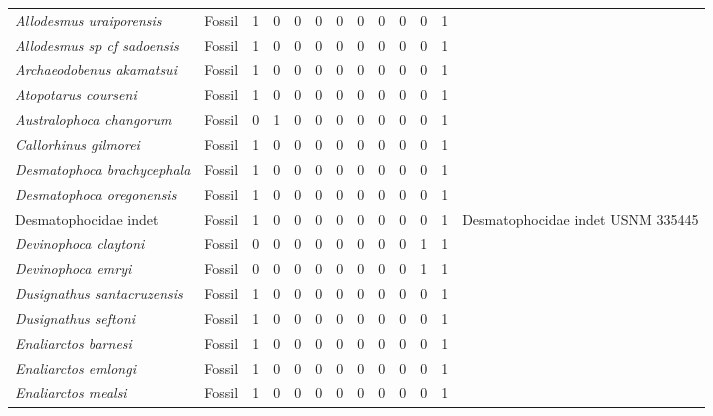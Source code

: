\begin{longtable}{llccccccccccp{}}
\textit{Allodesmus uraiporensis} &
Fossil &
1 &
0 &
0 &
0 &
0 &
0 &
0 &
0 &
0 &
1 &
\\

\textit{Allodesmus sp cf sadoensis} &
Fossil &
1 &
0 &
0 &
0 &
0 &
0 &
0 &
0 &
0 &
1 &
\\

\textit{Archaeodobenus akamatsui} &
Fossil &
1 &
0 &
0 &
0 &
0 &
0 &
0 &
0 &
0 &
1 &
\\

\textit{Atopotarus courseni} &
Fossil &
1 &
0 &
0 &
0 &
0 &
0 &
0 &
0 &
0 &
1 &
\\

\textit{Australophoca changorum} &
Fossil &
0 &
1 &
0 &
0 &
0 &
0 &
0 &
0 &
0 &
1 &
\\

\textit{Callorhinus gilmorei} &
Fossil &
1 &
0 &
0 &
0 &
0 &
0 &
0 &
0 &
0 &
1 &
\\

\textit{Desmatophoca brachycephala} &
Fossil &
1 &
0 &
0 &
0 &
0 &
0 &
0 &
0 &
0 &
1 &
\\

\textit{Desmatophoca oregonensis} &
Fossil &
1 &
0 &
0 &
0 &
0 &
0 &
0 &
0 &
0 &
1 &
\\

Desmatophocidae indet &
Fossil &
1 &
0 &
0 &
0 &
0 &
0 &
0 &
0 &
0 &
1 &
Desmatophocidae indet USNM 335445\\

\textit{Devinophoca claytoni} &
Fossil &
0 &
0 &
0 &
0 &
0 &
0 &
0 &
0 &
1 &
1 &
\\

\textit{Devinophoca emryi} &
Fossil &
0 &
0 &
0 &
0 &
0 &
0 &
0 &
0 &
1 &
1 &
\\

\textit{Dusignathus santacruzensis} &
Fossil &
1 &
0 &
0 &
0 &
0 &
0 &
0 &
0 &
0 &
1 &
\\

\textit{Dusignathus seftoni} &
Fossil &
1 &
0 &
0 &
0 &
0 &
0 &
0 &
0 &
0 &
1 &
\\

\textit{Enaliarctos barnesi} &
Fossil &
1 &
0 &
0 &
0 &
0 &
0 &
0 &
0 &
0 &
1 &
\\

\textit{Enaliarctos emlongi} &
Fossil &
1 &
0 &
0 &
0 &
0 &
0 &
0 &
0 &
0 &
1 &
\\

\textit{Enaliarctos mealsi} &
Fossil &
1 &
0 &
0 &
0 &
0 &
0 &
0 &
0 &
0 &
1 &
\\


\end{longtable}
